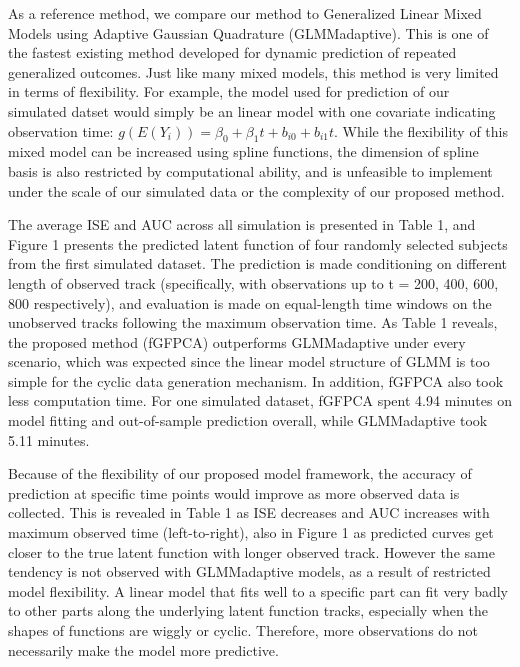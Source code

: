 \documentclass[
  11pt,
]{article}
\begin{document}
As a reference method, we compare our method to Generalized Linear Mixed
Models using Adaptive Gaussian Quadrature (GLMMadaptive). This is one of
the fastest existing method developed for dynamic prediction of repeated
generalized outcomes. Just like many mixed models, this method is very
limited in terms of flexibility. For example, the model used for
prediction of our simulated datset would simply be an linear model with
one covariate indicating observation time:
\(g(E(Y_i)) = \beta_0+\beta_1t+b_{i0}+b_{i1}t\). While the flexibility
of this mixed model can be increased using spline functions, the
dimension of spline basis is also restricted by computational ability,
and is unfeasible to implement under the scale of our simulated data or
the complexity of our proposed method.

The average ISE and AUC across all simulation is presented in Table 1,
and Figure 1 presents the predicted latent function of four randomly
selected subjects from the first simulated dataset. The prediction is
made conditioning on different length of observed track (specifically,
with observations up to t = 200, 400, 600, 800 respectively), and
evaluation is made on equal-length time windows on the unobserved tracks
following the maximum observation time. As Table 1 reveals, the proposed
method (fGFPCA) outperforms GLMMadaptive under every scenario, which was
expected since the linear model structure of GLMM is too simple for the
cyclic data generation mechanism. In addition, fGFPCA also took less
computation time. For one simulated dataset, fGFPCA spent 4.94 minutes
on model fitting and out-of-sample prediction overall, while
GLMMadaptive took 5.11 minutes.

Because of the flexibility of our proposed model framework, the accuracy
of prediction at specific time points would improve as more observed
data is collected. This is revealed in Table 1 as ISE decreases and AUC
increases with maximum observed time (left-to-right), also in Figure 1
as predicted curves get closer to the true latent function with longer
observed track. However the same tendency is not observed with
GLMMadaptive models, as a result of restricted model flexibility. A
linear model that fits well to a specific part can fit very badly to
other parts along the underlying latent function tracks, especially when
the shapes of functions are wiggly or cyclic. Therefore, more
observations do not necessarily make the model more predictive.
\end{document}
